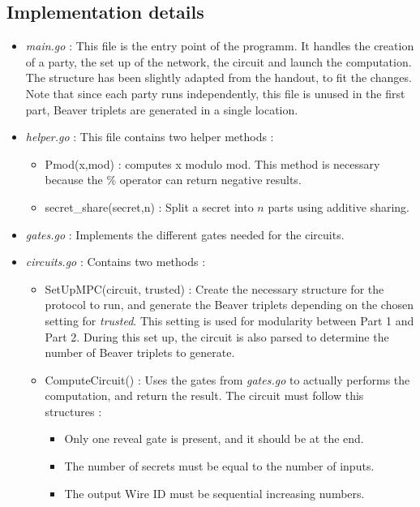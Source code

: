 \documentclass[10pt,conference]{IEEEtran}
\begin{document}
\subsection{Implementation details}
\begin{itemize}
    \item \textit{main.go} : This file is the entry point of the programm. It handles the creation of a party, the set up of the network, the circuit and launch the computation. The structure has been slightly adapted from the handout, to fit the changes. Note that since each party runs independently, this file is unused in the first part, Beaver triplets are generated in a single location.
    \item \textit{helper.go} : This file contains two helper methods :
        \begin{itemize}
            \item Pmod(x,mod) : computes x modulo mod. This method is necessary because the \% operator can return negative results.
            \item secret\_share(secret,n) : Split a secret into $n$ parts using additive sharing.
        \end{itemize}
    \item \textit{gates.go} : Implements the different gates needed for the circuits.
    \item \textit{circuits.go} : Contains two methods :
        \begin{itemize}
            \item SetUpMPC(circuit, trusted) : Create the necessary structure for the protocol to run, and generate the Beaver triplets depending on the chosen setting for \textit{trusted}. This setting is used for modularity between Part 1 and Part 2. During this set up, the circuit is also parsed to determine the number of Beaver triplets to generate.
            \item ComputeCircuit() : Uses the gates from \textit{gates.go} to actually performs the computation, and return the result. The circuit must follow this structures :
            \begin{itemize}
                \item Only one reveal gate is present, and it should be at the end.
                \item The number of secrets must be equal to the number of inputs.
                \item The output Wire ID must be sequential increasing numbers.
            \end{itemize}

\end{itemize}
\end{itemize}
\end{document}
